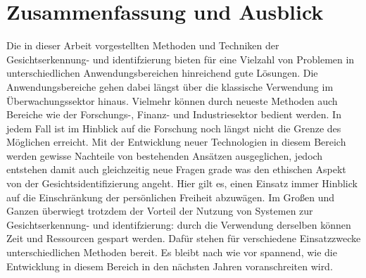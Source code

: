 \documentclass[doktyp=semarbeit, sprache=german]{TUBAFarbeiten}
\begin{document}
\section{Zusammenfassung und Ausblick}
Die in dieser Arbeit vorgestellten Methoden und Techniken der Gesichtserkennung- und identifzierung bieten für eine Vielzahl von Problemen in unterschiedlichen Anwendungsbereichen hinreichend gute Lösungen. Die Anwendungsbereiche gehen dabei längst über die klassische Verwendung im Überwachungssektor hinaus. Vielmehr können durch neueste Methoden auch Bereiche wie der Forschungs-, Finanz- und Industriesektor bedient werden. In jedem Fall ist im Hinblick auf die Forschung noch längst nicht die Grenze des Möglichen erreicht. Mit der Entwicklung neuer Technologien in diesem Bereich werden gewisse Nachteile von bestehenden Ansätzen ausgeglichen, jedoch entstehen damit auch gleichzeitig neue Fragen grade was den ethischen Aspekt von der Gesichtsidentifizierung angeht. Hier gilt es, einen Einsatz immer Hinblick auf die Einschränkung der persönlichen Freiheit abzuwägen. Im Großen und Ganzen überwiegt trotzdem der Vorteil der Nutzung von Systemen zur Gesichtserkennung- und identifzierung: durch die Verwendung derselben können Zeit und Ressourcen gespart werden. Dafür stehen für verschiedene Einsatzzwecke unterschiedlichen Methoden bereit. Es bleibt nach wie vor spannend, wie die Entwicklung in diesem Bereich in den nächsten Jahren voranschreiten wird.
\newpage
{}
\end{document}
